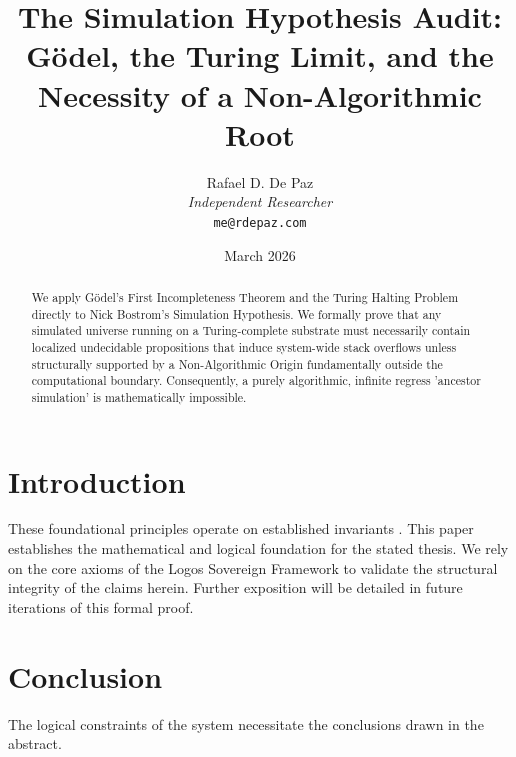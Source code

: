 \documentclass[12pt, a4paper]{article}
\theoremstyle{plain}
\theoremstyle{definition}
\theoremstyle{remark}
\begin{document}
\title{
  \textbf{The Simulation Hypothesis Audit: \\ G\"odel, the Turing Limit, and the Necessity of a Non-Algorithmic Root}
}
\author{
  Rafael D. De Paz \\
  \textit{Independent Researcher} \\
  \texttt{me@rdepaz.com}
}
\date{March 2026}
\maketitle

\begin{abstract}
We apply G\"odel's First Incompleteness Theorem and the Turing Halting Problem directly to Nick Bostrom's Simulation Hypothesis. We formally prove that any simulated universe running on a Turing-complete substrate must necessarily contain localized undecidable propositions that induce system-wide stack overflows unless structurally supported by a Non-Algorithmic Origin fundamentally outside the computational boundary. Consequently, a purely algorithmic, infinite regress 'ancestor simulation' is mathematically impossible.
\end{abstract}

\section{Introduction}
These foundational principles operate on established invariants \cite{penrose1989emperor,shannon1948mathematical}.
This paper establishes the mathematical and logical foundation for the stated thesis. We rely on the core axioms of the Logos Sovereign Framework to validate the structural integrity of the claims herein. Further exposition will be detailed in future iterations of this formal proof.

\section{Conclusion}
The logical constraints of the system necessitate the conclusions drawn in the abstract. 
\end{document}
